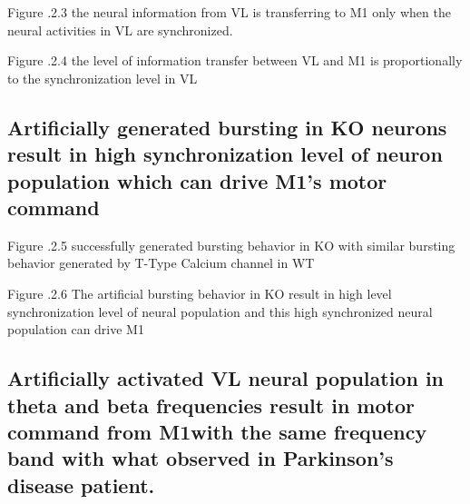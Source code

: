 Figure .2.3 the neural information from VL is transferring to M1 only when the neural activities in VL are synchronized.

Figure .2.4 the level of information transfer between VL and M1 is proportionally to the synchronization level in VL

\subsection{ Artificially generated bursting in KO neurons result in high synchronization level of neuron population which can drive M1’s motor command
}
Figure .2.5 successfully generated bursting behavior in KO with similar bursting behavior generated by T-Type Calcium channel in WT

Figure .2.6 The artificial bursting behavior in KO result in high level synchronization level of neural population and this high synchronized neural 
population can drive M1

\subsection{ Artificially activated VL neural population in theta and beta frequencies result in motor command from M1with the same frequency band with what observed in Parkinson’s disease patient.}

